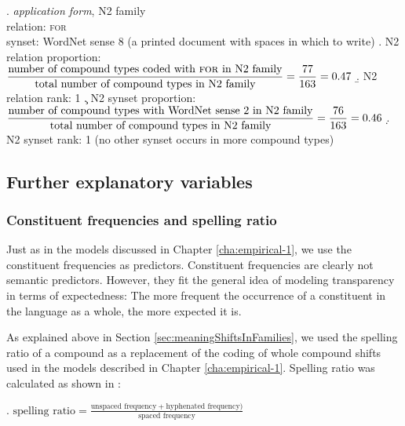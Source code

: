 \ex. \emph{application form}, N2 family\\
relation: \textsc{for}\\
synset: WordNet sense 8 ({a printed document with spaces in which to write})
\a. N2 relation proportion:\\[.5em] 
\( \displaystyle \frac{\textrm{number of compound types coded with
\textsc{for} in N2 family}}{\text{total number of compound types in
N2 family}}\\[.1em] = \frac{77}{163} = 0.47 \)  \vspace*{.3em}
\b. N2 relation rank: 1
\c. N2 synset proportion:\\[.5em]
\( \displaystyle \frac{\text{number of compound types with WordNet sense 2 in N2 family}}{\text{total number of compound types in
N2 family}}\\[.1em] = \frac{76}{163} = 0.46 \)  \vspace*{.3em}
\d. N2 synset rank: 1 (no other synset occurs in more
compound types)



\subsection{Further explanatory variables}
\label{sec:methodsFurtherExplanatory}

\subsubsection{Constituent frequencies and spelling ratio}
\label{sec:freqandspell}
Just as in the models discussed in Chapter \ref{cha:empirical-1}, %
we use the constituent
frequencies as predictors. Constituent frequencies are clearly not
semantic predictors. However, they fit the general idea of modeling
transparency in terms of expectedness: The more frequent the
occurrence of a constituent in the language as a whole, the more
expected it is. 

As explained above in Section \ref{sec:meaningShiftsInFamilies}, we used the spelling ratio of a compound as a
replacement of the coding of whole compound shifts used in the models
described in Chapter \ref{cha:empirical-1}. Spelling ratio was calculated as shown in \Next:

\ex. \( \displaystyle \text{spelling ratio} =  \frac{\text{unspaced frequency} + \text{hyphenated frequency})}{\text{spaced frequency}}\)

